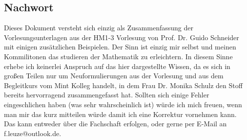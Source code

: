 \documentclass[12pt,a4paper]{article}%
\numberwithin{equation}{section}
\numberwithin{equation}{subsection}
\begin{document}
\subsection{Nachwort}
Dieses Dokument versteht sich einzig als Zusammenfassung der Vorlesungsunterlagen aus der HM1-3 Vorlesung von Prof. Dr. Guido Schneider mit einigen zusätzlichen Beispielen. Der Sinn ist einzig mir selbst und meinen Kommilitonen das studieren der Mathematik zu erleichtern. In diesem Sinne erhebe ich keinerlei Anspruch auf das hier dargestellte Wissen, da es sich in großen Teilen nur um Neuformulierungen aus der Vorlesung und aus dem Begleitkurs vom Mint Kolleg handelt, in dem Frau Dr. Monika Schulz den Stoff bereits hervorragend zusammengefasst hat. Sollten sich einige Fehler eingeschlichen haben (was sehr wahrscheinlich ist) würde ich mich freuen, wenn man mir das kurz mitteilen würde damit ich eine Korrektur vornehmen kann. Das kann entweder über die Fachschaft erfolgen, oder gerne per E-Mail an f.leuze@outlook.de.


\end{document}
